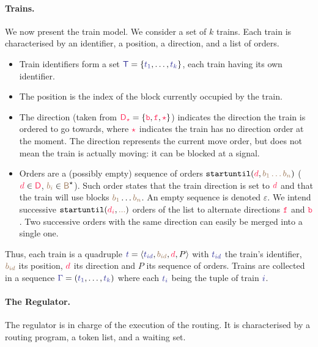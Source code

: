 \documentclass[runningheads]{llncs}
\newcommand{\directions}{\dirFmt{\mathsf{D}}}
\newcommand{\forward}{\ensuremath{\mathtt{f}}}
\newcommand{\backward}{\ensuremath{\mathtt{b}}\xspace}
\newcommand{\dirFmt}[1]{{\color{dircolor} #1}}
\newcommand{\dirForward}{\ensuremath{\dirFmt{\forward}}\xspace}
\newcommand{\dirBackward}{\ensuremath{\dirFmt{\backward}}\xspace}
\newcommand{\dirStop}{\ensuremath{\dirFmt{\star}}\xspace}
\newcommand{\posFmt}[1]{{\color{poscolor}{#1}}}
\newcommand{\blocks}{{\posFmt{\mathsf{B}}}}
\newcommand{\bid}[1]{\ensuremath{\posFmt{b_{#1}}}}
\newcommand{\trainFmt}[1]{{\color{traincolor} #1}}
\newcommand{\trainTuple}[4]{\langle \trainFmt{#1}, \posFmt{#2}, \dirFmt{#3}, #4 \rangle}
\newcommand{\trainSeq}{\ensuremath{\trainFmt{\Gamma}}\xspace}
\newcommand{\trains}{{\trainFmt{\mathsf{T}}}}
\newcommand{\tid}[1]{\ensuremath{\trainFmt{t_{#1}}}}
\newcommand{\su}[2]{{\mbox{$\mathtt{startuntil}(\dirFmt{#1}, \posFmt{#2})$}}\xspace}
\newcommand{\emptyTrainProg}{\varepsilon}
\begin{document}
\paragraph{Trains.}
We now present the train model. We consider a set of $k$ trains. 
Each train is characterised by an identifier, a position, a direction, and a list of orders.
\begin{itemize}
	\item Train identifiers form a set  $\trains = \{\tid{1}, \ldots, \tid{k}\}$, each train having its own identifier.
	\item The position is the index of the block currently occupied by the train.
	\item The direction (taken from $\directions_\dirStop = \{\dirBackward, \dirForward, \dirStop\}$) indicates the direction the train is ordered to go towards, where \dirStop indicates the train has no direction order at the moment. The direction represents the current move order, but does not mean the train is actually moving: it can be blocked at a signal.
	\item Orders are a (possibly empty) sequence of orders $\su{d}{\bid{1}\dots\bid{n}}$ ($\dirFmt{d} \in \directions$, $\bid{i} \in \blocks^\star$). Such order states that the train direction is set to $\dirFmt{d}$ and that the train will use blocks $\bid{1}\dots\bid{n}$. An empty sequence is denoted $\emptyTrainProg$. We intend successive \su{d_i}{...} orders of the list to alternate directions \dirForward{} and \dirBackward{}. Two successive orders with the same direction can easily be merged into a single one.
\end{itemize}

Thus, each train is a quadruple $\trainFmt{t} = \trainTuple{\tid{id}}{\bid{id}}{d}{P}$ with $\tid{id}$ the train's identifier, $\bid{id}$ its position, $\dirFmt{d}$ its direction and $P$ its sequence of orders. Trains are collected in a sequence $\trainSeq = (\trainFmt{t_1}, \ldots, \trainFmt{t_k})$ where each $\trainFmt{t_i}$ being the tuple of train $\trainFmt{i}$. 


\paragraph{The Regulator.}
The regulator is in charge of the execution of the routing.
It is characterised by a routing program, a token list, and a waiting set.
\end{document}
